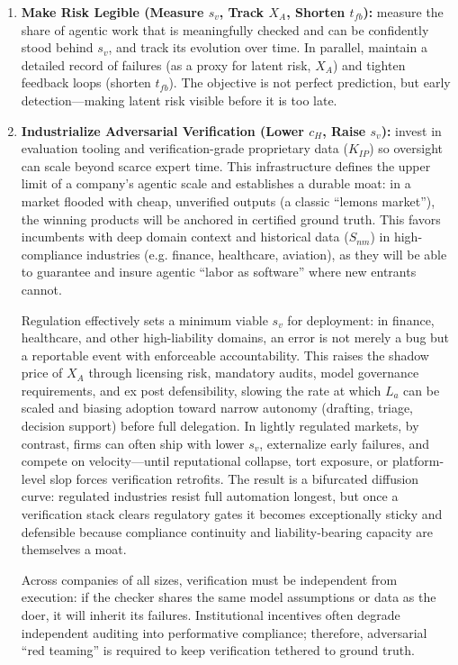 \documentclass[12pt, letter]{article}
\begin{document}
\begin{enumerate}
\item \textbf{Make Risk Legible (Measure $s_v$, Track $X_A$, Shorten $t_{fb}$):} measure the share of agentic work that is meaningfully checked and can be confidently stood behind $s_v$, and track its evolution over time. In parallel, maintain a detailed record of failures (as a proxy for latent risk, $X_A$) and tighten feedback loops (shorten $t_{fb}$). The objective is not perfect prediction, but early detection—making latent risk visible before it is too late.

\item \textbf{Industrialize Adversarial Verification (Lower $c_H$, Raise $s_v$):} invest in evaluation tooling and verification-grade proprietary data ($K_{IP}$) so oversight can scale beyond scarce expert time. This infrastructure defines the upper limit of a company's agentic scale and establishes a durable moat: in a market flooded with cheap, unverified outputs (a classic ``lemons market''), the winning products will be anchored in certified ground truth. This favors incumbents with deep domain context and historical data ($S_{nm}$) in high-compliance industries (e.g. finance, healthcare, aviation), as they will be able to guarantee and insure agentic ``labor as software'' where new entrants cannot. 

Regulation effectively sets a minimum viable $s_v$ for deployment: in finance, healthcare, and other high-liability domains, an error is not merely a bug but a reportable event with enforceable accountability. This raises the shadow price of $X_A$ through licensing risk, mandatory audits, model governance requirements, and ex post defensibility, slowing the rate at which $L_a$ can be scaled and biasing adoption toward narrow autonomy (drafting, triage, decision support) before full delegation. In lightly regulated markets, by contrast, firms can often ship with lower $s_v$, externalize early failures, and compete on velocity—until reputational collapse, tort exposure, or platform-level slop forces verification retrofits. The result is a bifurcated diffusion curve: regulated industries resist full automation longest, but once a verification stack clears regulatory gates it becomes exceptionally sticky and defensible because compliance continuity and liability-bearing capacity are themselves a moat.

Across companies of all sizes, verification must be independent from execution: if the checker shares the same model assumptions or data as the doer, it will inherit its failures. Institutional incentives often degrade independent auditing into performative compliance; therefore, adversarial ``red teaming'' is required to keep verification tethered to ground truth.


\end{enumerate}
\end{document}
